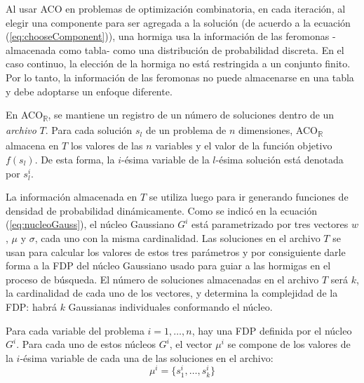 \documentclass{llncs}
\begin{document}
	Al usar ACO en problemas de optimización combinatoria, en cada iteración, al elegir una componente para ser agregada
	a la solución (de acuerdo a la ecuación (\ref{eq:chooseComponent})), una hormiga usa la información de las feromonas
	-almacenada como tabla- como una distribución de probabilidad discreta. En el caso continuo, la elección de la hormiga
	no está restringida a un conjunto finito. Por lo tanto, la información de las feromonas no puede almacenarse en una tabla
	y debe adoptarse un enfoque diferente.
	
	En ACO\textsubscript{$\mathbb{R}$}, se mantiene un registro de un número de soluciones dentro de un \textit{archivo} $T$. Para cada solución
	$s_l$ de un problema de $n$ dimensiones, ACO\textsubscript{$\mathbb{R}$} almacena en $T$ los valores de las $n$ variables y el valor de la
	función objetivo $f(s_l)$. De esta forma, la $i$-ésima variable de la $l$-ésima solución está denotada por $s_l^i$.
	
	La información almacenada en $T$ se utiliza luego para ir generando funciones de densidad de probabilidad dinámicamente. Como se
	indicó en la ecuación (\ref{eq:nucleoGauss}), el núcleo Gaussiano $G^i$ está parametrizado por tres vectores $w$, $\mu$ y $\sigma$,
	cada uno con la misma cardinalidad. Las soluciones en el archivo $T$ se usan para calcular los valores de estos 
	tres parámetros y por consiguiente darle forma a la FDP del núcleo Gaussiano usado para guiar a las hormigas en el proceso de búsqueda. El número de 	soluciones almacenadas en el archivo $T$ será $k$, la cardinalidad de cada uno de los vectores, y determina
	la complejidad de la FDP: habrá $k$ Gaussianas individuales conformando el núcleo.
	
	Para cada variable del problema $i = 1, \dots, n$, hay una FDP definida por el núcleo $G^i$. Para cada uno de estos núcleos $G^i$,
	el vector $\mu^i$ se compone de los valores de la $i$-ésima variable de cada una de las soluciones en el archivo:
	\begin{equation}
	\mu^i = \{s^i_1, \dots, s^i_k \}
	\end{equation}
	
\end{document}
